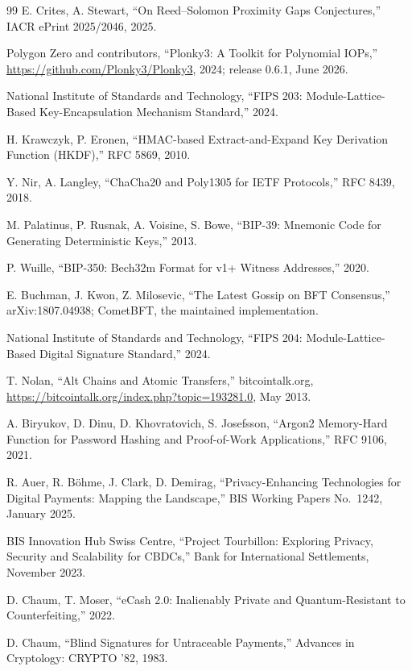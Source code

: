 \documentclass[twocolumn,10pt]{article}
\begin{document}
\begin{thebibliography}{99}
 E. Crites, A. Stewart, ``On Reed--Solomon Proximity Gaps Conjectures,'' IACR ePrint 2025/2046, 2025.

 Polygon Zero and contributors, ``Plonky3: A Toolkit for Polynomial IOPs,'' \url{https://github.com/Plonky3/Plonky3}, 2024; release 0.6.1, June 2026.

 National Institute of Standards and Technology, ``FIPS 203: Module-Lattice-Based Key-Encapsulation Mechanism Standard,'' 2024.

 H. Krawczyk, P. Eronen, ``HMAC-based Extract-and-Expand Key Derivation Function (HKDF),'' RFC 5869, 2010.

 Y. Nir, A. Langley, ``ChaCha20 and Poly1305 for IETF Protocols,'' RFC 8439, 2018.

 M. Palatinus, P. Rusnak, A. Voisine, S. Bowe, ``BIP-39: Mnemonic Code for Generating Deterministic Keys,'' 2013.

 P. Wuille, ``BIP-350: Bech32m Format for v1+ Witness Addresses,'' 2020.

 E. Buchman, J. Kwon, Z. Milosevic, ``The Latest Gossip on BFT Consensus,'' arXiv:1807.04938; CometBFT, the maintained implementation.

 National Institute of Standards and Technology, ``FIPS 204: Module-Lattice-Based Digital Signature Standard,'' 2024.

 T. Nolan, ``Alt Chains and Atomic Transfers,'' bitcointalk.org, \url{https://bitcointalk.org/index.php?topic=193281.0}, May 2013.

 A. Biryukov, D. Dinu, D. Khovratovich, S. Josefsson, ``Argon2 Memory-Hard Function for Password Hashing and Proof-of-Work Applications,'' RFC 9106, 2021.

 R. Auer, R. B\"ohme, J. Clark, D. Demirag, ``Privacy-Enhancing Technologies for Digital Payments: Mapping the Landscape,'' BIS Working Papers No.~1242, January 2025.

 BIS Innovation Hub Swiss Centre, ``Project Tourbillon: Exploring Privacy, Security and Scalability for CBDCs,'' Bank for International Settlements, November 2023.

 D. Chaum, T. Moser, ``eCash 2.0: Inalienably Private and Quantum-Resistant to Counterfeiting,'' 2022.

 D. Chaum, ``Blind Signatures for Untraceable Payments,'' Advances in Cryptology: CRYPTO '82, 1983.


\end{thebibliography}
\end{document}

